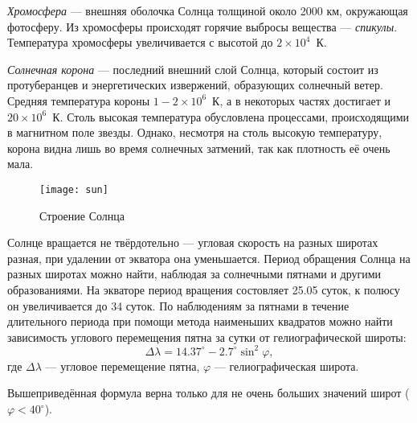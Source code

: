 \textit{Хромосфера} --- внешняя оболочка Солнца толщиной около 2000 км, окружающая фотосферу. Из хромосферы происходят горячие  выбросы вещества --- \textit{спикулы}. Температура хромосферы увеличивается с высотой до $2\times10^4$~К.

\textit{Солнечная корона} --- последний внешний слой Солнца, который состоит из протуберанцев и энергетических  извержений, образующих солнечный ветер. Средняя температура короны $1-2\times10^6$~К, а в некоторых частях достигает  и $20\times10^6$~К. Столь высокая температура обусловлена процессами, происходящими в магнитном поле звезды. Однако, несмотря на столь высокую температуру, корона видна лишь во время солнечных затмений, так как плотность её очень мала.
  
  
  
\begin{figure}[h!]
\begin{center}
\texttt{[image: sun]}
\caption{Строение Солнца}
\end{center}
\end{figure}

Солнце вращается не твёрдотельно --- угловая скорость на разных широтах разная, при удалении от экватора она уменьшается. Период обращения Солнца на разных широтах можно найти, наблюдая за солнечными пятнами и другими образованиями. На экваторе период вращения состовляет 25.05 суток, к полюсу он увеличивается до 34 суток. По наблюдениям за пятнами в течение длительного периода при помощи метода наименьших квадратов можно найти зависимость углового перемещения пятна за сутки от гелиографической широты:
\begin{equation}
\Delta\lambda=14.37^{\circ}-2.7^{\circ}\sin^2\varphi,
\end{equation}
где $\Delta\lambda$ --- угловое перемещение пятна, $\varphi$ --- гелиографическая широта.

Вышеприведённая формула верна только для не очень больших значений широт ($\varphi<40^{\circ}$).
